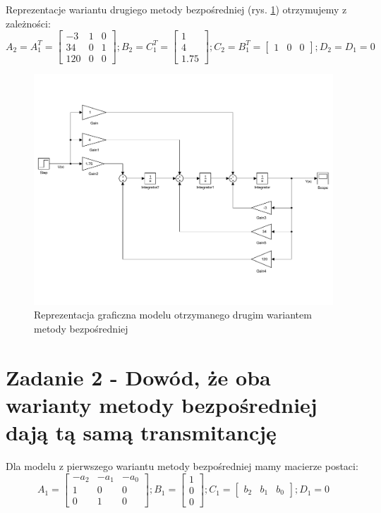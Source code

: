 \documentclass{article}
\begin{document}
Reprezentacje wariantu drugiego metody bezpośredniej (rys. \ref{fig:z12}) otrzymujemy z zależności:
\[A_2 = A_1^T = \begin{bmatrix} -3 & 1 & 0\\ 34 & 0 & 1\\ 120 & 0 & 0 \end{bmatrix};
B_2 = C_1^T = \begin{bmatrix}  1\\ 4\\ 1.75 \end{bmatrix};
C_2 = B_1^T = \begin{bmatrix} 1 & 0 & 0 \end{bmatrix};
D_2 = D_1 = 0
\]
\begin{figure}[H]
\centering
\includegraphics[width=0.9\linewidth]{Z1_2}
\caption{Reprezentacja graficzna modelu otrzymanego drugim wariantem metody bezpośredniej}
\label{fig:z12}
\end{figure}

\section{Zadanie 2 - Dowód, że oba warianty metody bezpośredniej dają tą samą transmitancję}
Dla modelu z pierwszego wariantu metody bezpośredniej mamy macierze postaci:
\[A_1 = \begin{bmatrix} -a_2 & -a_1 & -a_0\\ 1 & 0 & 0\\ 0 & 1 & 0 \end{bmatrix};
B_1 = \begin{bmatrix} 1\\ 0\\ 0 \end{bmatrix};
C_1 = \begin{bmatrix} b_2 & b_1 & b_0 \end{bmatrix};
D_1 = 0
\]
\end{document}
